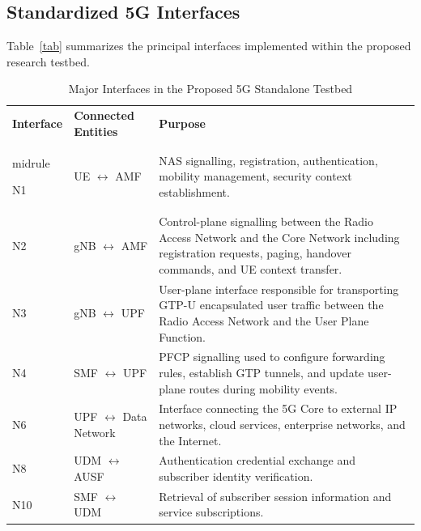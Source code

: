 \documentclass[12pt,a4paper]{article}\usepackage[a4paper,margin=1in]{geometry}\usepackage{graphicx}\usepackage{longtable}\usepackage{booktabs}\usepackage{hyperref}\usepackage{enumitem}\usepackage{amsmath}\usepackage{tikz}\usepackage{pgfgantt}\usepackage{setspace}\setstretch{1.15}\usetikzlibrary{positioning,arrows.meta,shapes.geometric}
\begin{document}
	\vspace{0.3cm}
	
	\subsection{Standardized 5G Interfaces}
	
	Table~\ref{tab} summarizes the principal interfaces implemented within the proposed research testbed.
	
	\begin{table}[h]
		\centering
		\caption{Major Interfaces in the Proposed 5G Standalone Testbed}
		
		\begin{tabular}{p{2cm}p{3.8cm}p{8.5cm}}\toprule\textbf{Interface} &\textbf{Connected Entities} &\textbf{Purpose} \\midrule
			
			N1 &
			UE $\leftrightarrow$ AMF &
			NAS signalling, registration, authentication, mobility management, security context establishment. \\
			
			N2 &
			gNB $\leftrightarrow$ AMF &
			Control-plane signalling between the Radio Access Network and the Core Network including registration requests, paging, handover commands, and UE context transfer. \\
			
			N3 &
			gNB $\leftrightarrow$ UPF &
			User-plane interface responsible for transporting GTP-U encapsulated user traffic between the Radio Access Network and the User Plane Function. \\
			
			N4 &
			SMF $\leftrightarrow$ UPF &
			PFCP signalling used to configure forwarding rules, establish GTP tunnels, and update user-plane routes during mobility events. \\
			
			N6 &
			UPF $\leftrightarrow$ Data Network &
			Interface connecting the 5G Core to external IP networks, cloud services, enterprise networks, and the Internet. \\
			
			N8 &
			UDM $\leftrightarrow$ AUSF &
			Authentication credential exchange and subscriber identity verification. \\
			
			N10 &
			SMF $\leftrightarrow$ UDM &
			Retrieval of subscriber session information and service subscriptions. \\
			

\end{tabular}
\end{table}
\end{document}
